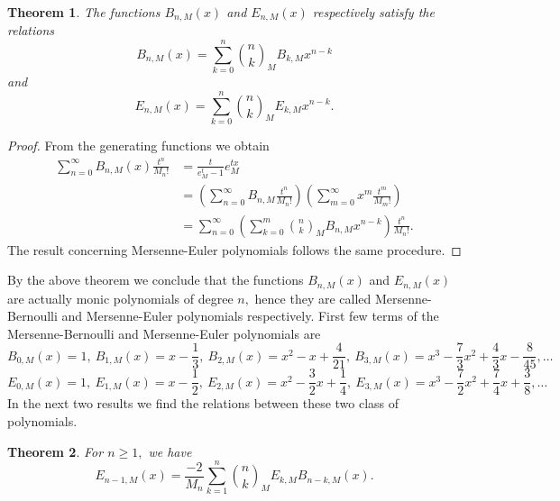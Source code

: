 \documentclass[12pt, a4paper]{article}
\newtheorem{theorem}{Theorem}[section]
\begin{document}
\begin{theorem} \label{th: 3_1}
The functions $B_{n,M}(x)$ and $E_{n,M}(x)$ respectively satisfy the relations
\begin{equation*} 
B_{n,M}(x) = \sum_{k=0}^{n}\binom{n}{k}_MB_{k,M}x^{n-k}
\end{equation*}
and
\begin{equation*} 
E_{n,M}(x) = \sum_{k=0}^{n}\binom{n}{k}_ME_{k,M}x^{n-k}.
\end{equation*}
\end{theorem}
\begin{proof}
From the generating functions we obtain 
\begin{align*}
\sum_{n=0}^{\infty} B_{n,M}(x) \frac{t^n}{M_n!} &= \frac{t}{e^t_M-1}e^{tx}_M \\
&= \left(\sum_{n=0}^{\infty} B_{n,M} \frac{t^n}{M_n!}\right)\left(\sum_{m=0}^{\infty} x^m\frac{t^m}{M_m!}\right)\\
&= \sum_{n=0}^{\infty}\left(\sum_{k=0}^{m}\binom{n}{k}_MB_{n,M}x^{n-k}\right)\frac{t^n}{M_n!}.
\end{align*}
The result concerning Mersenne-Euler polynomials follows the same procedure.
\end{proof}
By the above theorem we conclude that the functions $B_{n,M}(x)$ and $E_{n,M}(x)$ are actually monic polynomials of degree $n,$ hence they are called Mersenne-Bernoulli and Mersenne-Euler polynomials respectively.
First few terms of the Mersenne-Bernoulli and Mersenne-Euler polynomials are
\[
B_{0,M}(x) = 1,
~B_{1,M}(x) = x-\frac{1}{3},
~B_{2,M}(x) = x^2-x+\frac{4}{21},
~B_{3,M}(x) = x^3-\frac{7}{3}x^2+\frac{4}{3}x-\frac{8}{45},\dots
\]
\[
E_{0,M}(x) = 1,
~E_{1,M}(x) = x-\frac{1}{2},
~E_{2,M}(x) = x^2-\frac{3}{2}x+\frac{1}{4},
~E_{3,M}(x) = x^3-\frac{7}{2}x^2+\frac{7}{4}x+\frac{3}{8}, \dots
\]
In the next two results we find the relations between these two class of polynomials.
\begin{theorem}
For $n \geq 1,$ we have
\begin{equation*}
E_{n-1,M}(x) = \frac{-2}{M_n}\sum_{k=1}^{n}\binom{n}{k}_ME_{k,M}B_{n-k,M}(x).
\end{equation*}
\end{theorem}
\end{document}

